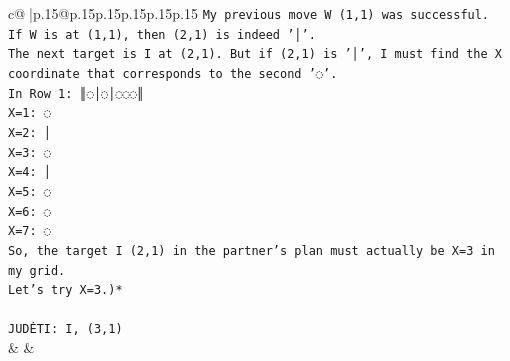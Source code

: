 \documentclass{article}
\begin{document}
{\begin{supertabular}{c@{$\;$}|p{.15\linewidth}@{}p{.15\linewidth}p{.15\linewidth}p{.15\linewidth}p{.15\linewidth}p{.15\linewidth}}
{{{\texttt{My previous move W (1,1) was successful.} \\
\texttt{If W is at (1,1), then (2,1) is indeed '│'.} \\
\texttt{The next target is I at (2,1). But if (2,1) is '│', I must find the X coordinate that corresponds to the second '◌'.} \\
\texttt{In Row 1: ║◌│◌│◌◌◌║} \\
\texttt{X=1: ◌} \\
\texttt{X=2: │} \\
\texttt{X=3: ◌} \\
\texttt{X=4: │} \\
\texttt{X=5: ◌} \\
\texttt{X=6: ◌} \\
\texttt{X=7: ◌} \\
\texttt{So, the target I (2,1) in the partner's plan must actually be X=3 in my grid.} \\
\texttt{Let's try X=3.)*} \\
\\ 
\texttt{JUDĖTI: I, (3,1)} \\
            }
        }
    }
    & & \\ \\


\end{supertabular}}
\end{document}
